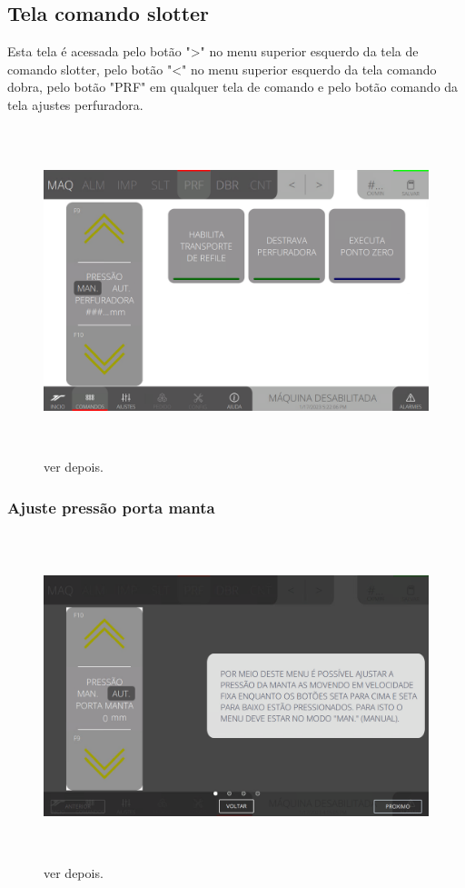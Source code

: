 \thispagestyle{fancy}
\vspace*{\fill}
\subsection{Tela comando slotter}
 Esta tela é acessada pelo botão "\textgreater" no menu superior esquerdo da tela de comando slotter, pelo botão "\textless{}" no menu superior esquerdo da tela comando dobra, pelo botão "PRF" em qualquer tela de comando e pelo botão comando da tela ajustes perfuradora.
\begin{figure}[h]
  \centering
  \includegraphics[width=576px,height=360px]{src/imagesFlexo/06-drilling/commands/e-Tela-Principal.png}
  \caption{ver depois.}
   \label{}
\end{figure}

\newpage
\thispagestyle{fancy}
\vspace*{\fill}
\subsubsection{\small{Ajuste pressão porta manta}}
\begin{figure}[h]
  \centering
  \includegraphics[width=576px,height=360px]{src/imagesFlexo/06-drilling/commands/e-1.png}
  \caption{ver depois.}
   \label{}
\end{figure}
\vspace*{\fill}

